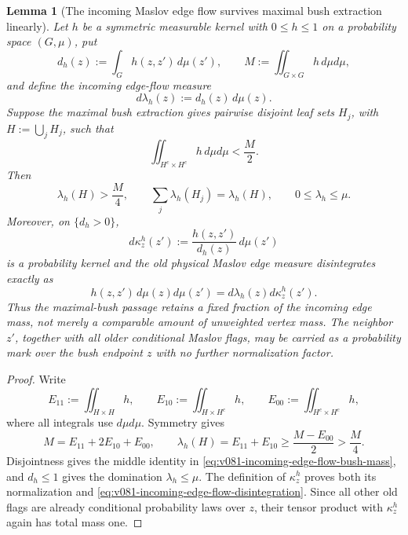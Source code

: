 \documentclass[10pt]{article}
\newtheorem{lemma}[theorem]{Lemma}
\begin{document}
\begin{lemma}[The incoming Maslov edge flow survives maximal bush extraction linearly]
\label{lem:v081-incoming-edge-flow-bush-extraction}
Let \(h\) be a symmetric measurable kernel with \(0\le h\le1\) on a probability space
\((G,\mu)\), put
\[
d_h(z):=\int_Gh(z,z')\,d\mu(z'),
\qquad
M:=\iint_{G\times G}h\,d\mu d\mu,
\]
and define the incoming edge-flow measure
\[
d\lambda_h(z):=d_h(z)\,d\mu(z).
\]
Suppose the maximal bush extraction gives pairwise disjoint leaf sets \(H_j\), with
\(H:=\bigcup_jH_j\), such that
\[
\iint_{H^c\times H^c}h\,d\mu d\mu<\frac M2.
\]
Then
\begin{equation}
\label{eq:v081-incoming-edge-flow-bush-mass}
\boxed{
\lambda_h(H)>\frac M4,
\qquad
\sum_j\lambda_h(H_j)=\lambda_h(H),
\qquad
0\le\lambda_h\le\mu.
}
\end{equation}
Moreover, on \(\{d_h>0\}\),
\[
d\kappa_z^h(z')
:=
\frac{h(z,z')}{d_h(z)}\,d\mu(z')
\]
is a probability kernel and the old physical Maslov edge measure disintegrates exactly as
\begin{equation}
\label{eq:v081-incoming-edge-flow-disintegration}
\boxed{
h(z,z')\,d\mu(z)d\mu(z')
=
d\lambda_h(z)d\kappa_z^h(z').
}
\end{equation}
Thus the maximal-bush passage retains a fixed fraction of the incoming \emph{edge} mass, not merely
a comparable amount of unweighted vertex mass.  The neighbor \(z'\), together with all older
conditional Maslov flags, may be carried as a probability mark over the bush endpoint \(z\) with
no further normalization factor.
\end{lemma}

\begin{proof}
Write
\[
E_{11}:=\iint_{H\times H}h,
\qquad
E_{10}:=\iint_{H\times H^c}h,
\qquad
E_{00}:=\iint_{H^c\times H^c}h,
\]
where all integrals use \(d\mu d\mu\).  Symmetry gives
\[
M=E_{11}+2E_{10}+E_{00},
\qquad
\lambda_h(H)=E_{11}+E_{10}
\ge\frac{M-E_{00}}2
>\frac M4.
\]
Disjointness gives the middle identity in
\eqref{eq:v081-incoming-edge-flow-bush-mass}, and \(d_h\le1\) gives the domination
\(\lambda_h\le\mu\).  The definition of \(\kappa_z^h\) proves both its normalization and
\eqref{eq:v081-incoming-edge-flow-disintegration}.  Since all other old flags are already
conditional probability laws over \(z\), their tensor product with \(\kappa_z^h\) again has total
mass one.
\end{proof}
\end{document}
